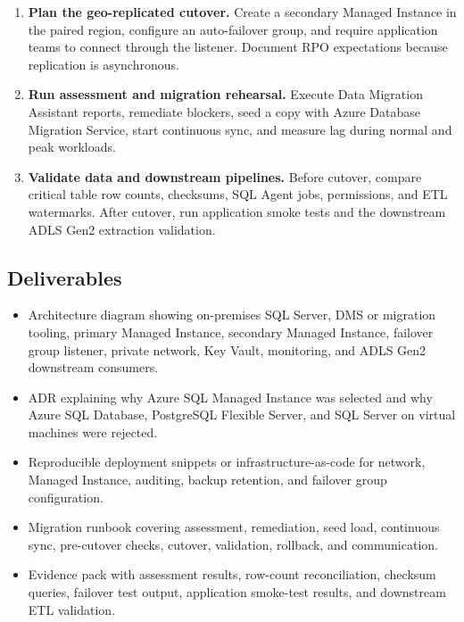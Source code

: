 \begin{enumerate}
\begin{lstlisting}[language=bash,caption={Managed Instance creation skeleton and configuration evidence commands.},label={lst:ch2-capstone-mi-cli}]
az sql mi create `
  --resource-group $rg `
  --name $mi `
  --location $location `
  --subnet $subnetId `
  --admin-user $admin `
  --admin-password $plainPassword `
  --license-type BasePrice `
  --storage 256GB `
  --capacity 4 `
  --tier GeneralPurpose `
  --family Gen5

az sql mi show `
  --resource-group $rg `
  --name $mi `
  --query "{name:name,state:state,sku:sku.name,storage:storageSizeInGB,subnet:subnetId}" `
  --output table
\end{lstlisting}

    \item \textbf{Plan the geo-replicated cutover.} Create a secondary Managed Instance in the paired region, configure an auto-failover group, and require application teams to connect through the listener. Document RPO expectations because replication is asynchronous.
    \item \textbf{Run assessment and migration rehearsal.} Execute Data Migration Assistant reports, remediate blockers, seed a copy with Azure Database Migration Service, start continuous sync, and measure lag during normal and peak workloads.
    \item \textbf{Validate data and downstream pipelines.} Before cutover, compare critical table row counts, checksums, SQL Agent jobs, permissions, and ETL watermarks. After cutover, run application smoke tests and the downstream ADLS Gen2 extraction validation.
\end{enumerate}

\subsection*{Deliverables}
\begin{itemize}
    \item Architecture diagram showing on-premises SQL Server, DMS or migration tooling, primary Managed Instance, secondary Managed Instance, failover group listener, private network, Key Vault, monitoring, and ADLS Gen2 downstream consumers.
    \item ADR explaining why Azure SQL Managed Instance was selected and why Azure SQL Database, PostgreSQL Flexible Server, and SQL Server on virtual machines were rejected.
    \item Reproducible deployment snippets or infrastructure-as-code for network, Managed Instance, auditing, backup retention, and failover group configuration.
    \item Migration runbook covering assessment, remediation, seed load, continuous sync, pre-cutover checks, cutover, validation, rollback, and communication.
    \item Evidence pack with assessment results, row-count reconciliation, checksum queries, failover test output, application smoke-test results, and downstream ETL validation.
\end{itemize}

